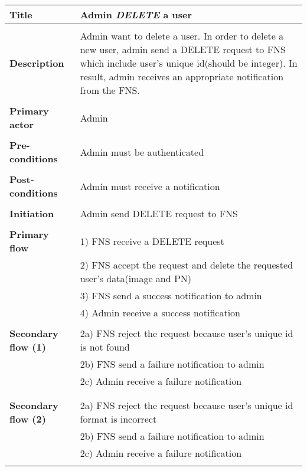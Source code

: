 \documentclass[a4paper,11pt]{article}
\begin{document}
\newpage
\noindent
\begin{tabular}{|p{4cm}|p{10cm}|} \hline
    \textbf{Title} &   Admin \emph{DELETE} a user
        
    \\ \hline \rowcolor{Gray} & \\ \hline
        
    \textbf{Description} &  Admin want to delete a user. In order to delete a new user, admin send a DELETE request to FNS which include user's unique id(should be integer). In result, admin receives an appropriate notification from the FNS.
        
    \\ \hline \rowcolor{Gray} & \\ \hline
        
    \textbf{Primary actor} & Admin  
        
    \\ \hline \rowcolor{Gray} & \\ \hline 
          
    \textbf{Pre-conditions} &   Admin must be authenticated
        
    \\ \hline \rowcolor{Gray} & \\ \hline
         
    \textbf{Post-conditions} &   Admin must receive a notification
        
    \\ \hline \rowcolor{Gray} & \\ \hline 
         
    \textbf{Initiation} & Admin send DELETE request to FNS
        
    \\ \hline \rowcolor{Gray} & \\ \hline 
         
    \textbf{Primary flow} & 
    1) FNS receive a DELETE request \\&
    2) FNS accept the request and delete the requested user's data(image and PN) \\&
    3) FNS send a success notification to admin \\&
    4) Admin receive a success notification
        
    \\ \hline \rowcolor{Gray} & \\ \hline 
         
    \textbf{Secondary flow (1)} & 
    2a) FNS reject the request because user's unique id is not found \\&
    2b) FNS send a failure notification to admin\\&
    2c) Admin receive a failure notification \\& 
     
    \\ \hline \rowcolor{Gray} & \\ \hline 
     
    \textbf{Secondary flow (2)} & 
    2a) FNS reject the request because user's unique id format is incorrect \\&
    2b) FNS send a failure notification to admin\\&
    2c) Admin receive a failure notification \\&
    \\ \hline 
\end{tabular}
\end{document}
